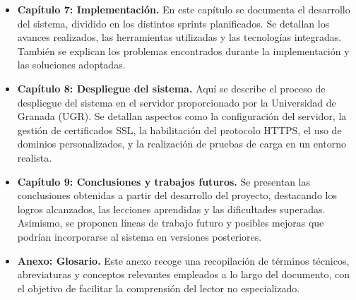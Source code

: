 \begin{itemize}
    \item \textbf{Capítulo 7: Implementación.} En este capítulo se documenta el desarrollo del sistema, dividido en los distintos sprints planificados. Se detallan los avances realizados, las herramientas utilizadas y las tecnologías integradas. También se explican los problemas encontrados durante la implementación y las soluciones adoptadas.
    
    \item \textbf{Capítulo 8: Despliegue del sistema.} Aquí se describe el proceso de despliegue del sistema en el servidor proporcionado por la Universidad de Granada (UGR). Se detallan aspectos como la configuración del servidor, la gestión de certificados SSL, la habilitación del protocolo HTTPS, el uso de dominios personalizados, y la realización de pruebas de carga en un entorno realista.
    
    \item \textbf{Capítulo 9: Conclusiones y trabajos futuros.} Se presentan las conclusiones obtenidas a partir del desarrollo del proyecto, destacando los logros alcanzados, las lecciones aprendidas y las dificultades superadas. Asimismo, se proponen líneas de trabajo futuro y posibles mejoras que podrían incorporarse al sistema en versiones posteriores.
    
    \item \textbf{Anexo: Glosario.} Este anexo recoge una recopilación de términos técnicos, abreviaturas y conceptos relevantes empleados a lo largo del documento, con el objetivo de facilitar la comprensión del lector no especializado.
\end{itemize}